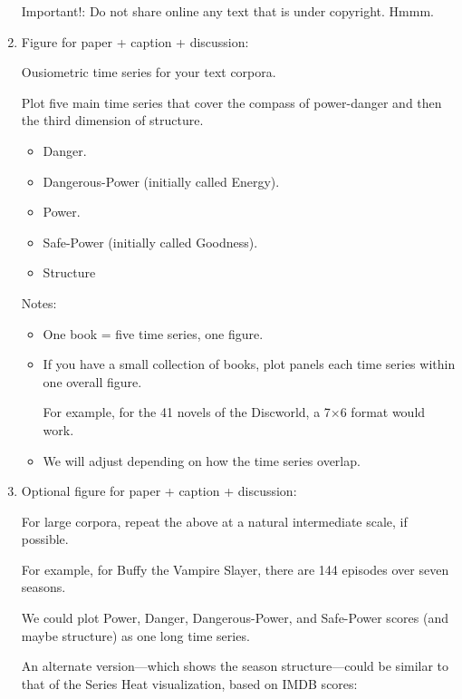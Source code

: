 \begin{enumerate}
  Important!: Do not share online any text that is under copyright. Hmmm.

\item
  Figure for paper + caption + discussion:

  Ousiometric time series for your text corpora.

  Plot five main time series that cover the
  compass of power-danger and then the third dimension of structure.
  \begin{itemize}
  \item
    Danger.
  \item
    Dangerous-Power (initially called Energy).
  \item
    Power.
  \item
    Safe-Power (initially called Goodness).
  \item
    Structure
  \end{itemize}

  Notes:
  \begin{itemize}
  \item
    One book = five time series, one figure.
  \item
    If you have a small collection of books, plot panels each time series within one overall figure.

    For example, for the 41 novels of the Discworld, a 7$\times$6 format would work.
  \item
    We will adjust depending on how the time series overlap.
  \end{itemize}

\item
  Optional figure for paper + caption + discussion:

  For large corpora, repeat the above at a natural intermediate scale, if possible.

  For example, for Buffy the Vampire Slayer, there are 144 episodes over seven seasons.

  We could plot
  Power,
  Danger,
  Dangerous-Power,
  and
  Safe-Power
  scores (and maybe structure)
  as one long time series.

  An alternate version---which shows the season structure---could be similar to that
  of the Series Heat visualization, based on IMDB scores:

  \begin{center}
  \end{center}


\end{enumerate}
